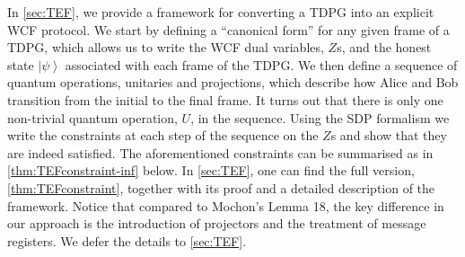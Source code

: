 \documentclass{theoretics}
\begin{document}
In \cref{sec:TEF}, we provide a framework for converting a TDPG into an explicit WCF
protocol. We start by defining a ``canonical form'' for any given
frame of a TDPG, which
allows us to write the WCF dual variables,
$Z$s, and the honest state $\left|\psi\right\rangle $ associated
with each frame of the TDPG. We then define a sequence of quantum operations,
unitaries and projections, which describe how Alice and Bob transition
from the initial to the final frame. It turns out that there
is only one non-trivial quantum operation, $U$, in the sequence. Using the SDP
formalism we write the constraints at each step of the sequence on
the $Z$s and show that they are indeed satisfied. The aforementioned constraints can be summarised as in \cref{thm:TEFconstraint-inf} below. In \cref{sec:TEF}, one can find the full version, \cref{thm:TEFconstraint}, together with its proof and a detailed description of the framework. { Notice that compared to Mochon's Lemma 18, the key difference in our approach is the introduction of projectors and the treatment of message registers. We defer the details to \cref{sec:TEF}.}
%
\end{document}
